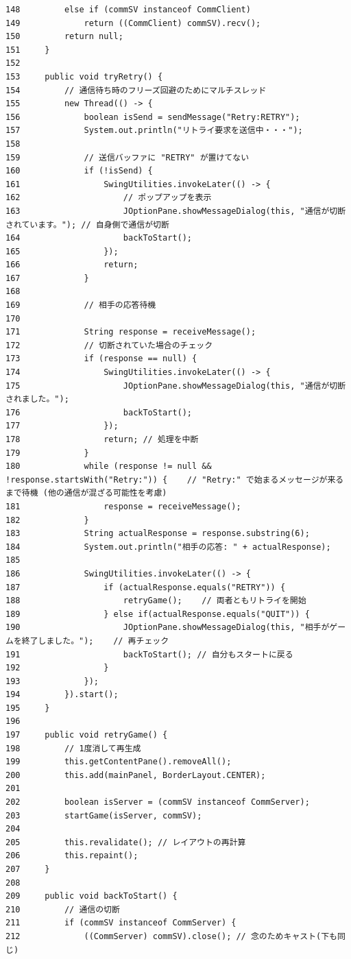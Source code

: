 \documentclass[11pt,a4j]{jarticle}
\begin{document}
\begin{small}
\begin{verbatim}
148         else if (commSV instanceof CommClient)
149             return ((CommClient) commSV).recv();
150         return null;
151     }
152 
153     public void tryRetry() {
154         // 通信待ち時のフリーズ回避のためにマルチスレッド
155         new Thread(() -> {
156             boolean isSend = sendMessage("Retry:RETRY");
157             System.out.println("リトライ要求を送信中・・・");
158 
159             // 送信バッファに "RETRY" が置けてない
160             if (!isSend) {
161                 SwingUtilities.invokeLater(() -> {
162                     // ポップアップを表示
163                     JOptionPane.showMessageDialog(this, "通信が切断されています。"); // 自身側で通信が切断
164                     backToStart();
165                 });
166                 return;
167             }
168 
169             // 相手の応答待機
170 
171             String response = receiveMessage();
172             // 切断されていた場合のチェック
173             if (response == null) {
174                 SwingUtilities.invokeLater(() -> {
175                     JOptionPane.showMessageDialog(this, "通信が切断されました。");
176                     backToStart();
177                 });
178                 return; // 処理を中断
179             }
180             while (response != null && !response.startsWith("Retry:")) {    // "Retry:" で始まるメッセージが来るまで待機 (他の通信が混ざる可能性を考慮)
181                 response = receiveMessage();
182             }
183             String actualResponse = response.substring(6);
184             System.out.println("相手の応答: " + actualResponse);
185 
186             SwingUtilities.invokeLater(() -> {
187                 if (actualResponse.equals("RETRY")) {
188                     retryGame();    // 両者ともリトライを開始
189                 } else if(actualResponse.equals("QUIT")) {
190                     JOptionPane.showMessageDialog(this, "相手がゲームを終了しました。");    // 再チェック
191                     backToStart(); // 自分もスタートに戻る
192                 }
193             });
194         }).start();
195     }
196 
197     public void retryGame() {
198         // 1度消して再生成
199         this.getContentPane().removeAll();
200         this.add(mainPanel, BorderLayout.CENTER);
201 
202         boolean isServer = (commSV instanceof CommServer);
203         startGame(isServer, commSV);
204 
205         this.revalidate(); // レイアウトの再計算
206         this.repaint();
207     }
208 
209     public void backToStart() {
210         // 通信の切断
211         if (commSV instanceof CommServer) {
212             ((CommServer) commSV).close(); // 念のためキャスト(下も同じ)

\end{verbatim}
\end{small}
\end{document}
